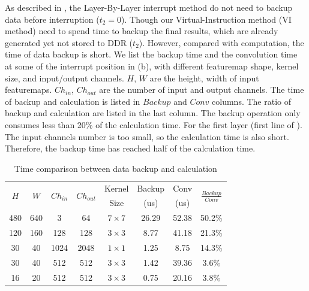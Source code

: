 As described in , the Layer-By-Layer interrupt method do not need to backup data before interruption ($t_2 = 0$). Though our Virtual-Instruction method (VI method) need to spend time to backup the final results, which are already generated yet not stored to DDR ($t_2$). However, compared with computation, the time of data backup is short. We list the backup time and the convolution time at some of the interrupt position in (b), with different featuremap shape, kernel size, and input/output channels. $H$, $W$ are the height, width of input featuremaps. $Ch_{in}$, $Ch_{out}$ are the number of input and output channels. The time of backup and calculation is listed in $Backup$ and $Conv$ columns. The ratio of backup and calculation are listed in the last column. The backup operation only consumes less than 20\% of the calculation time. For the first layer (first line of ). The input channels number is too small, so the calculation time is also short. Therefore, the backup time has reached half of the calculation time. 

\begin{table}[t]
  \centering
  \caption{Time comparison between data backup and calculation}
    \begin{tabular}{|c|c|c|c|c|c|c|c|}
    \hline
    \multirow{2}[2]{*}{$H$} & \multirow{2}[2]{*}{$W$} & \multirow{2}[2]{*}{$Ch_{in}$} & \multirow{2}[2]{*}{$Ch_{out}$} & Kernel & Backup & Conv  & \multirow{2}[2]{*}{$\frac{Backup}{Conv}$} \bigstrut[t]\\
          &       &       &       & Size  & (us)  & (us)  &  \\
    \hline
    480   & 640   & 3     & 64    & $7 \times 7$ & 26.29  & 52.38  & 50.2\% \\
    \hline
    120   & 160   & 128   & 128   & $3 \times 3$ & 8.77  & 41.18  & 21.3\% \\
    \hline
    30    & 40    & 1024  & 2048  & $1 \times 1$ & 1.25  & 8.75  & 14.3\% \\
    \hline
    30    & 40    & 512   & 512   & $3 \times 3$ & 1.42  & 39.36  & 3.6\% \\
    \hline
    16    & 20    & 512   & 512   & $3 \times 3$ & 0.75  & 20.16  & 3.8\% \\
    \hline
    \end{tabular}%
  \label{tab:timecompare}%
\end{table}%




